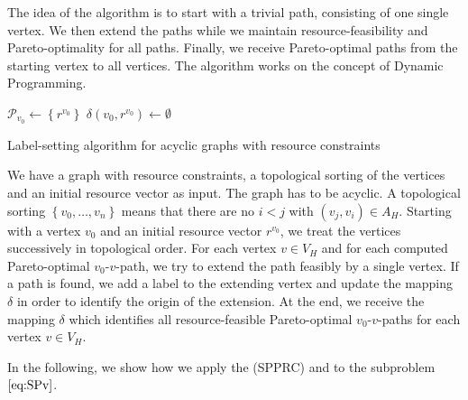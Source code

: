 The idea of the algorithm is to start with a trivial path, consisting of one single vertex. We then extend the paths while we maintain resource-feasibility and Pareto-optimality for all paths. Finally, we receive Pareto-optimal paths from the starting vertex to all vertices. The algorithm works on the concept of Dynamic Programming.

\begin{algorithm}[hbt]
	\SetAlgoLined
	$\mathcal{P}_{v_0}\gets\left\{r^{v_0}\right\}$ \;
	$\delta\left(v_0,r^{v_0}\right)\gets\emptyset$ \;
	\Return{$\delta$}
	\caption{Label-setting algorithm for acyclic graphs with resource constraints}
	\label{alg:label_setting}
\end{algorithm}

We have a graph with resource constraints, a topological sorting of the vertices and an initial resource vector as input. The graph has to be acyclic. A topological sorting ${\left\{v_0,\dots,v_n\right\}}$ means that there are no $i<j$ with ${\left(v_j,v_i\right)\in A_H}$. Starting with a vertex $v_0$ and an initial resource vector $r^{v_0}$, we treat the vertices successively in topological order. For each vertex $v\in V_H$ and for each computed Pareto-optimal $v_0$-$v$-path, we try to extend the path feasibly by a single vertex. If a path is found, we add a label to the extending vertex and update the mapping $\delta$ in order to identify the origin of the extension. At the end, we receive the mapping $\delta$ which identifies all resource-feasible Pareto-optimal $v_0$-$v$-paths for each vertex $v\in V_H$.

In the following, we show how we apply the (SPPRC) and  to the subproblem $\eqref{eq:SPv}$.


